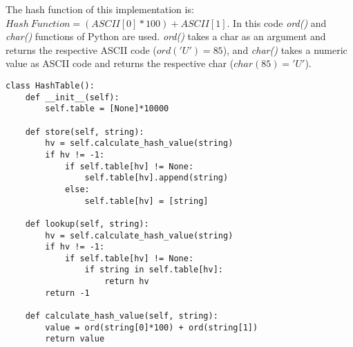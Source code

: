The hash function of this implementation is: \(Hash \ Function = (ASCII[0]*100) + ASCII[1]\). In this code \textit{ord()} and \textit{char()} functions of Python are used. \textit{ord()} takes a char as an argument and returns the respective ASCII code (\(ord('U')=85\)), and \textit{char()} takes a numeric value as ASCII code and returns the respective char (\(char(85)='U'\)).
\begin{lstlisting}[firstnumber=1, caption={String key implementation.}]
class HashTable():
	def __init__(self):
		self.table = [None]*10000
	
	def store(self, string):
		hv = self.calculate_hash_value(string)
		if hv != -1:
			if self.table[hv] != None:
				self.table[hv].append(string)
			else:
				self.table[hv] = [string]
	
	def lookup(self, string):
		hv = self.calculate_hash_value(string)
		if hv != -1:
			if self.table[hv] != None:
				if string in self.table[hv]:
					return hv
		return -1
	
	def calculate_hash_value(self, string):
		value = ord(string[0]*100) + ord(string[1])
		return value
\end{lstlisting}